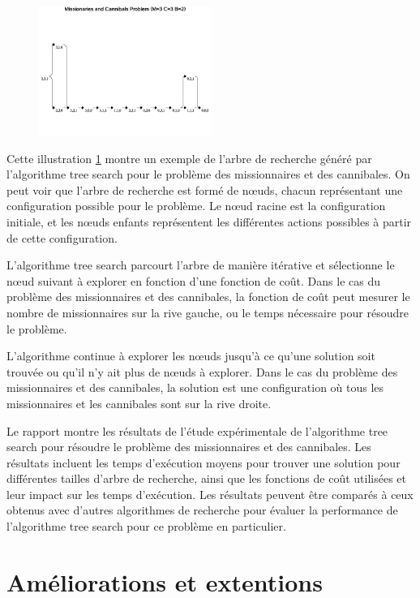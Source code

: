 \documentclass{article}
\begin{document}
\begin{figure}[h]
\centering
\includegraphics[width=0.5\textwidth]{tree_search_example.png}
\label{fig:tree_search_example}
\end{figure}

Cette illustration \ref{fig:tree_search_example} montre un exemple de l'arbre de recherche généré par l'algorithme tree search pour le problème des missionnaires et des cannibales. On peut voir que l'arbre de recherche est formé de nœuds, chacun représentant une configuration possible pour le problème. Le nœud racine est la configuration initiale, et les nœuds enfants représentent les différentes actions possibles à partir de cette configuration.

L'algorithme tree search parcourt l'arbre de manière itérative et sélectionne le nœud suivant à explorer en fonction d'une fonction de coût. Dans le cas du problème des missionnaires et des cannibales, la fonction de coût peut mesurer le nombre de missionnaires sur la rive gauche, ou le temps nécessaire pour résoudre le problème.

L'algorithme continue à explorer les nœuds jusqu'à ce qu'une solution soit trouvée ou qu'il n'y ait plus de nœuds à explorer. Dans le cas du problème des missionnaires et des cannibales, la solution est une configuration où tous les missionnaires et les cannibales sont sur la rive droite.

Le rapport montre les résultats de l'étude expérimentale de l'algorithme tree search pour résoudre le problème des missionnaires et des cannibales. Les résultats incluent les temps d'exécution moyens pour trouver une solution pour différentes tailles d'arbre de recherche, ainsi que les fonctions de coût utilisées et leur impact sur les temps d'exécution. Les résultats peuvent être comparés à ceux obtenus avec d'autres algorithmes de recherche pour évaluer la performance de l'algorithme tree search pour ce problème en particulier.

\section{Améliorations et extentions}
\end{document}
